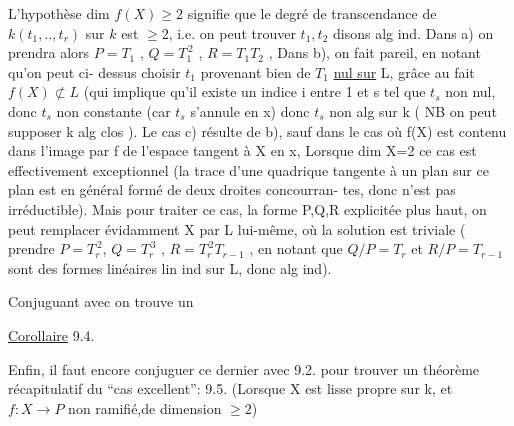 
L'hypothèse  dim $f(X)\geqslant 2$  signifie que  le degré de transcendance de
$k(t_1,..,t_r)$ sur $k$  est $\geqslant 2$, i.e. on peut trouver  $t_1,t_2$ disons alg ind.
Dans a) on prendra alors   $P = T_1$ , $Q = T_1^{\,2}$ , $R = T_1T_2$ , Dans b), on
fait pareil,  en notant qu'on peut ci-%
dessus choisir $t_1$ provenant bien de $T_1$ \uline{nul sur} L, grâce au fait $f(X)\not\subset L$
(qui implique qu'il  existe un indice  i  entre 1 et s tel que $t_s$ non
nul, donc $t_s$ non constante (car $t_s$ s'annule en x) donc $t_s$  non alg sur k
( NB on peut supposer k alg clos ).  Le cas c) résulte de b),  sauf dans le cas où  f(X) est contenu dans
l'image  par f de l'espace tangent à X en x,  \hand{[}Lorsque dim X=2
ce cas est effectivement exceptionnel (la trace d'une quadrique tangente
à un plan sur ce plan est en général formé de deux droites concourran-%
tes, donc n'est pas irréductible)\hand{]}. Mais pour traiter ce cas,  la
forme P,Q,R explicitée plus haut, on peut remplacer  évidamment X par
L lui-même, où la solution est triviale ( prendre $P=T_r^{\,2}$, $Q=T_r^{\,3}$ ,
$R = T_r^{\,2}T_{r-1}$ , en notant que  $Q/P = T_r$ et  $R/P = T_{r-1}$ sont des formes
linéaires lin ind sur L, donc alg ind). 

Conjuguant avec  on trouve un

\uline{Corollaire} 9.4.   

Enfin, il faut encore conjuguer  ce dernier avec 9.2. pour
trouver un théorème récapitulatif  du ``cas excellent'':
 9.5.   (Lorsque X est lisse  propre sur k, et $f:X\to P$ non
ramifié,de dimension $\geqslant 2$)

